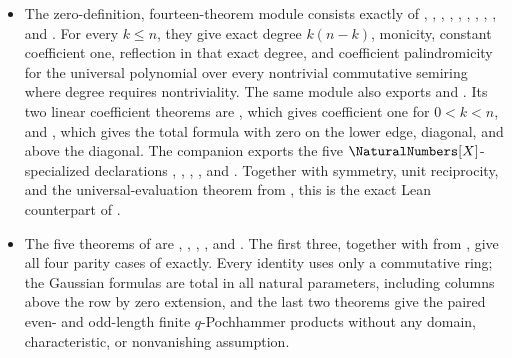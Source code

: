 \documentclass[11pt,a4paper,oneside,openany]{book}
\theoremstyle{definition}
\theoremstyle{remark}
\begin{document}
\begin{itemize}
\item The zero-definition, fourteen-theorem module
 consists exactly of
,
,
,
,
,
,
,
,
, and
.  For every \(k\le n\),
they give exact degree \(k(n-k)\), monicity, constant coefficient one,
reflection in that exact degree, and coefficient palindromicity for the
universal polynomial over every nontrivial commutative semiring where degree
requires nontriviality.  The same module also exports
 and
.  Its two linear
coefficient theorems are
, which gives coefficient
one for \(0<k<n\), and
, which gives the total formula with
zero on the lower edge, diagonal, and above the diagonal.  The companion
 exports the five
\(\NaturalNumbers[X]\)-specialized declarations
,
,
,
, and
.  Together with symmetry,
unit reciprocity, and the universal-evaluation theorem from
, this is the exact Lean counterpart of
.

\item The five theorems of  are
,
,
,
, and
.  The first three, together
with
 from
, give all four parity cases of
 exactly.  Every identity uses only a commutative ring;
the Gaussian formulas are total in all natural parameters, including
columns above the row by zero extension, and the last two theorems give the
paired even- and odd-length finite $q$-Pochhammer products without any
domain, characteristic, or nonvanishing assumption.


\end{itemize}
\end{document}
